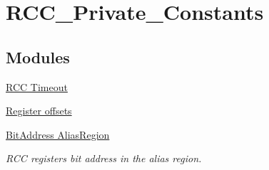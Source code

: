\hypertarget{group___r_c_c___private___constants}{\section{R\-C\-C\-\_\-\-Private\-\_\-\-Constants}
\label{group___r_c_c___private___constants}
}
\subsection*{Modules}
\begin{DoxyCompactItemize}
\item 
\hyperlink{group___r_c_c___timeout}{R\-C\-C Timeout}
\item 
\hyperlink{group___r_c_c___register___offset}{Register offsets}
\item 
\hyperlink{group___r_c_c___bit_address___alias_region}{Bit\-Address Alias\-Region}
\begin{DoxyCompactList}\small\item\em R\-C\-C registers bit address in the alias region. \end{DoxyCompactList}\end{DoxyCompactItemize}
